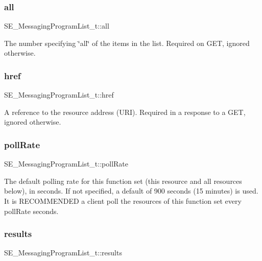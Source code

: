 \subsubsection{\texorpdfstring{all}{all}}
{\footnotesize\ttfamily S\+E\+\_\+\+Messaging\+Program\+List\+\_\+t\+::all}

The number specifying \char`\"{}all\char`\"{} of the items in the list. Required on G\+ET, ignored otherwise. \mbox{\label{group__MessagingProgramList_gacb5855c7001a05d1d58e43cc706e70e9}} 
\subsubsection{\texorpdfstring{href}{href}}
{\footnotesize\ttfamily S\+E\+\_\+\+Messaging\+Program\+List\+\_\+t\+::href}

A reference to the resource address (U\+RI). Required in a response to a G\+ET, ignored otherwise. \mbox{\label{group__MessagingProgramList_gabeb074e1c506b7857d306774059cf652}} 
\subsubsection{\texorpdfstring{poll\+Rate}{pollRate}}
{\footnotesize\ttfamily S\+E\+\_\+\+Messaging\+Program\+List\+\_\+t\+::poll\+Rate}

The default polling rate for this function set (this resource and all resources below), in seconds. If not specified, a default of 900 seconds (15 minutes) is used. It is R\+E\+C\+O\+M\+M\+E\+N\+D\+ED a client poll the resources of this function set every poll\+Rate seconds. \mbox{\label{group__MessagingProgramList_gacdca1166c19d3e607e004b7511f6f70b}} 
\subsubsection{\texorpdfstring{results}{results}}
{\footnotesize\ttfamily S\+E\+\_\+\+Messaging\+Program\+List\+\_\+t\+::results}

